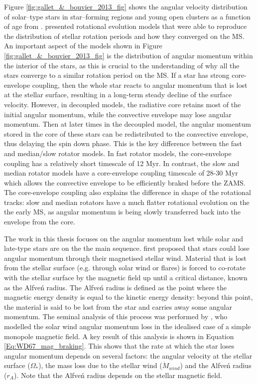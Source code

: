Figure \ref{fig:gallet_&_bouvier_2013_fig} shows the angular velocity distribution of solar--type stars in star--forming regions and young open clusters as a function of age from \citet{Gallet_Bouvier_2013}. \citet{Gallet_Bouvier_2013} presented rotational evolution models that were able to reproduce the distribution of stellar rotation periods and how they converged on the MS. An important aspect of the models shown in Figure \ref{fig:gallet_&_bouvier_2013_fig} is the distribution of angular momentum within the interior of the stars, as this is crucial to the understanding of why all the stars converge to a similar rotation period on the MS. If a star has strong core-envelope coupling, then the whole star reacts to angular momentum that is lost at the stellar surface, resulting in a long-term steady decline of the surface velocity. However, in decoupled models, the radiative core retains most of the initial angular momentum, while the convective envelope may lose angular momentum. Then at later times in the decoupled model, the angular momentum stored in the core of these stars can be redistributed to the convective envelope, thus delaying the spin down phase. This is the key difference between the fast and median/slow rotator models. In fast rotator models, the core-envelope coupling has a relatively short timescale of 12 Myr. In contrast, the slow and median rotator models have a core-envelope coupling timescale of 28-30 Myr which allows the convective envelope to be efficiently braked before the ZAMS. The core-envelope coupling also explains the difference in shape of the rotational tracks: slow and median rotators have a much flatter rotational evolution on the the early MS, as angular momentum is being slowly transferred back into the envelope from the core.

The work in this thesis focuses on the angular momentum lost while solar and late-type stars are on the the main sequence. \citet{Schatzman_1962} first proposed that stars could lose angular momentum through their magnetised stellar wind. Material that is lost from the stellar surface (e.g. through solar wind or flares) is forced to co-rotate with the stellar surface by the magnetic field up until a critical distance, known as the Alfve\'n radius. The Alfve\'n radius is defined as the point where the magnetic energy density is equal to the kinetic energy density: beyond this point, the material is said to be lost from the star and carries away some angular momentum. The seminal analysis of this process was performed by \citet{Weber_&_Davis_1967}, who modelled the solar wind angular momentum loss in the idealised case of a simple monopole magnetic field. A key result of this analysis is shown in Equation \ref{Eq:WD67_mag_braking}. This shows that the rate at which the star loses angular momentum depends on several factors: the angular velocity at the stellar surface ($\Omega_{*}$), the mass loss due to the stellar wind ($\dot{M}_{wind}$) and the Alfve\'n radius ($r_{A}$). Note that the Alfve\'n radius depends on the stellar magnetic field.

